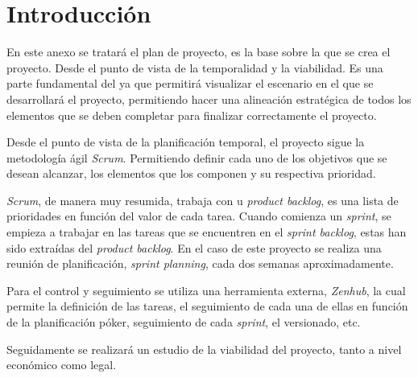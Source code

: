 \section{Introducción}
En este anexo se tratará el plan de proyecto, es la base sobre la que se crea el proyecto. Desde el punto de vista de la temporalidad y la viabilidad. Es una parte fundamental del ya que permitirá visualizar el escenario en el que se desarrollará el proyecto, permitiendo hacer una alineación estratégica de todos los elementos que se deben completar para finalizar correctamente el proyecto.

Desde el punto de vista de la planificación temporal, el proyecto sigue la metodología ágil \textit{Scrum}. Permitiendo definir cada uno de los objetivos que se desean alcanzar, los elementos que los componen y su respectiva prioridad.

\textit{Scrum}, de manera muy resumida, trabaja con u \textit{product backlog}, es una lista de prioridades en función del valor de cada tarea. Cuando comienza un \textit{sprint}, se empieza a trabajar en las tareas que se encuentren en el \textit{sprint backlog}, estas han sido extraídas del \textit{product backlog}. En el caso de este proyecto se realiza una reunión de planificación, \textit{sprint planning}, cada dos semanas aproximadamente.

Para el control y seguimiento se utiliza una herramienta externa, \textit{Zenhub}, la cual permite la definición de las tareas, el seguimiento de cada una de ellas en función de la planificación póker, seguimiento de cada \textit{sprint}, el versionado, etc.

Seguidamente se realizará un estudio de la viabilidad del proyecto, tanto a nivel económico como legal.
\newpage

